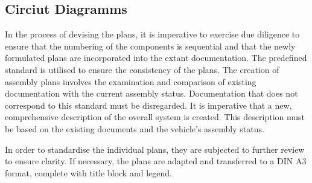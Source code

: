 \subsection*{ Circiut Diagramms}
In the process of devising the plans, it is imperative to exercise due diligence to ensure that the numbering of the components is sequential and that the newly formulated plans are incorporated into the extant documentation. The predefined standard is utilised to ensure the consistency of the plans.\newline
The creation of assembly plans involves the examination and comparison of existing documentation with the current assembly status. Documentation that does not correspond to this standard must be disregarded. It is imperative that a new, comprehensive description of the overall system is created. This description must be based on the existing documents and the vehicle's assembly status.\newline


In order to standardise the individual plans, they are subjected to further review to ensure clarity. If necessary, the plans are adapted and transferred to a DIN A3 format, complete with title block and legend.



